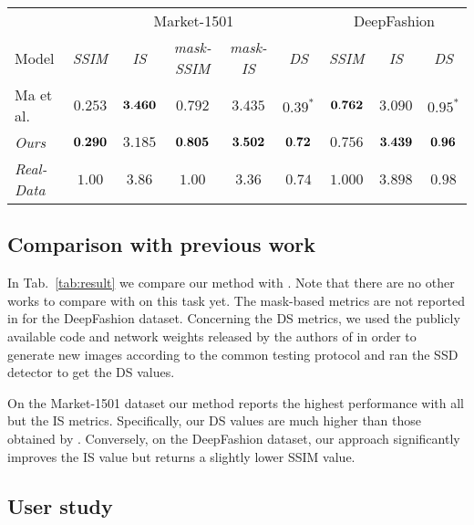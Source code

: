 \documentclass[10pt,twocolumn,letterpaper]{article}
\begin{document}
\begin{table*}[h!]
\caption{Comparison with the state of the art. $(*)$ These values have been computed 
using the code and the network weights released by Ma et al. \cite{ma2017pose} in order to generate new images.}
\centering
\begin{tabular}{l|ccccc|ccc}
  \hline
  &\multicolumn{5}{c|}{Market-1501}&\multicolumn{3}{c}{DeepFashion}\\
 Model &\emph{SSIM} & \emph{IS}&\emph{mask-SSIM} & \emph{mask-IS} &\emph{DS}& \emph{SSIM} & \emph{IS} &\emph{DS}\\
\hline
Ma et al. \cite{ma2017pose} &\bf$0.253$ & $\bf3.460$ & $0.792$ & $3.435$& $0.39^*$  &$\bf0.762$ & $3.090$ & $0.95^*$  \\
\emph{Ours}&$\bf0.290$ & $3.185$ & $\bf0.805$ & $\bf3.502$& $\bf0.72$ &$0.756$ & $\bf3.439$ & $\bf0.96$ \\
\hline
\emph{Real-Data}&$1.00$ & $3.86$ & $1.00$ & $3.36$& $0.74$ &$1.000$ & $3.898$ & $0.98$ \\
\hline
\end{tabular}
\label{tab:result}
\end{table*}

\subsection{Comparison with previous work}
\label{Comparison}

In Tab.~\ref{tab:result} we compare our method with \cite{ma2017pose}. Note that there are no other works to compare with on this task yet. 
The mask-based metrics are not reported in \cite{ma2017pose} for the DeepFashion dataset.
Concerning the DS metrics,
we used the publicly available code and  network weights released by the authors of \cite{ma2017pose} in order to
generate new images according to the common testing protocol  and  ran the SSD detector to get the DS values.

On the Market-1501 dataset our method
 reports the highest performance with all but the IS metrics. Specifically, our  DS values are much higher than those obtained by \cite{ma2017pose}.
Conversely, on the DeepFashion dataset, our approach significantly improves the IS value but returns a slightly lower SSIM value. 

\subsection{User study}
\label{Userstudy}
\end{document}
